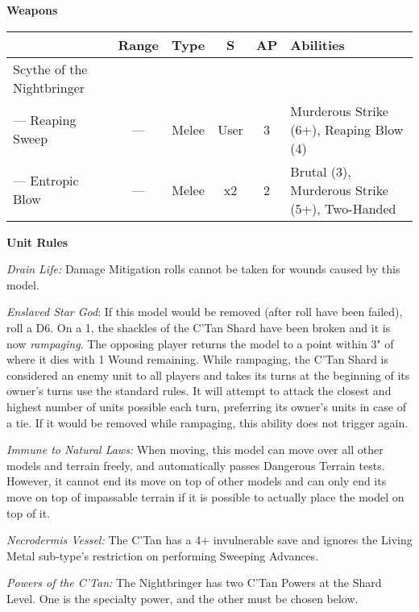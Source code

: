 \begin{minipage}[t]{0.72\textwidth}
	\vspace*{2em}
	\textbf{Weapons}
	
	\begin{tabular}{m{95 pt} *{4}{c} >{\raggedright\arraybackslash}p{130pt}}
		& Range & Type & S & AP & Abilities \\
		\hline
		Scythe of the Nightbringer & & & & & \\
		— Reaping Sweep & — & Melee & User & 3 & Murderous Strike (6+), Reaping Blow (4) \\
		— Entropic Blow & — & Melee & x2 & 2 & Brutal (3), Murderous Strike (5+), Two-Handed \\
	\end{tabular}
	
	\vspace*{2em}
	\textbf{Unit Rules}
	
	\textit{Drain Life:} Damage Mitigation rolls cannot be taken for wounds caused by this model.
	
	\textit{Enslaved Star God}: If this model would be removed (after  roll have been failed), roll a D6. On a 1, the shackles of the C'Tan Shard have been broken and it is now \textit{rampaging}. The opposing player returns the model to a point within 3" of where it dies with 1 Wound remaining. While rampaging, the C'Tan Shard is considered an enemy unit to all players and takes its turns at the beginning of its owner's turns use the standard rules. It will attempt to attack the closest and highest number of units possible each turn, preferring its owner's units in case of a tie. If it would be removed while rampaging, this ability does not trigger again.
	
	\textit{Immune to Natural Laws:} When moving, this model can move over all other models and terrain freely, and automatically passes Dangerous Terrain tests. However, it cannot end its move on top of other models and can only end its move on top of impassable terrain if it is possible to actually place the model on top of it.
	
	\textit{Necrodermis Vessel:} The C'Tan has a 4+ invulnerable save and ignores the Living Metal sub-type's restriction on performing Sweeping Advances.
	
	\textit{Powers of the C'Tan:} The Nightbringer has two C'Tan Powers at the Shard Level. One is the  specialty power, and the other must be chosen below.
	

\end{minipage}
